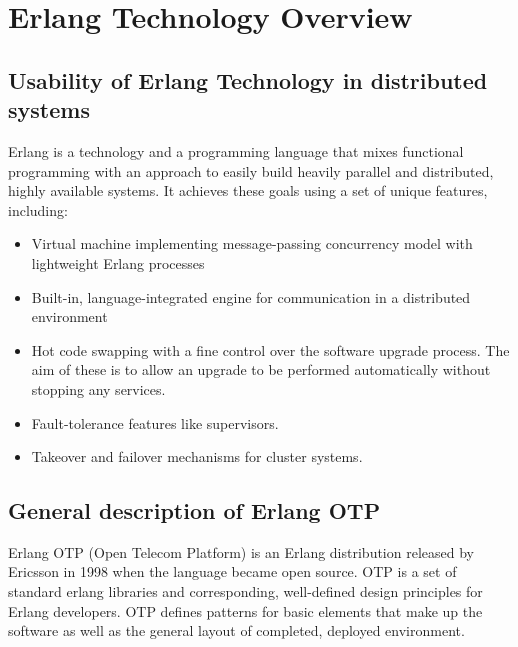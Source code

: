 \section{Erlang Technology Overview}

\subsection{Usability of Erlang Technology in distributed systems}

Erlang is a technology and a programming language that mixes functional programming with
an approach to easily build heavily parallel and distributed, highly available systems. It achieves
these goals using a set of unique features, including:

\begin{itemize}

\item Virtual machine implementing message-passing concurrency model with
lightweight Erlang processes
\item Built-in, language-integrated engine for communication in a distributed environment
\item Hot code swapping with a fine control over the software upgrade process. The aim of these
is to allow an upgrade to be performed automatically without stopping any services.
\item Fault-tolerance features like supervisors.
\item Takeover and failover mechanisms for cluster systems.

\end{itemize}

\subsection{General description of Erlang OTP}

Erlang OTP (Open Telecom Platform) is an Erlang distribution released by Ericsson in 1998
when the language became open source. OTP is a set of standard erlang libraries and
corresponding, well-defined design principles for Erlang developers. OTP defines patterns
for basic elements that make up the software as well as the general layout of completed,
deployed environment.

